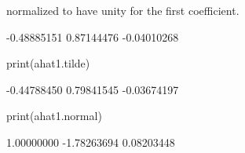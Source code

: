 \documentclass[a4paper]{article}
\renewcommand{\~}{\perispomeni}%
\begin{document}
normalized to have unity for the first coefficient.
\begin{Schunk}
\begin{Soutput}
[1] -0.48885151  0.87144476 -0.04010268
\end{Soutput}
\begin{Sinput}
 print(ahat1.tilde)
\end{Sinput}
\begin{Soutput}
[1] -0.44788450  0.79841545 -0.03674197
\end{Soutput}
\begin{Sinput}
 print(ahat1.normal)
\end{Sinput}
\begin{Soutput}
[1]  1.00000000 -1.78263694  0.08203448
\end{Soutput}
\end{Schunk}
\end{document}

